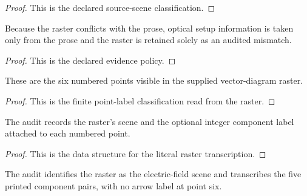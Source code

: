 \begin{proof}
  This is the declared source-scene classification.
\end{proof}
\begin{definition}
  \label{def:physics:phyx-mini-0478:phyxminiproblems-problemphyxmini0478-evidencepolicy}
  Because the raster conflicts with the prose, optical setup information is taken only from the prose and the raster is retained solely as an audited mismatch.
\end{definition}
\begin{proof}
  This is the declared evidence policy.
\end{proof}
\begin{definition}
  \label{def:physics:phyx-mini-0478:phyxminiproblems-problemphyxmini0478-rasterpoint}
  These are the six numbered points visible in the supplied vector-diagram raster.
\end{definition}
\begin{proof}
  This is the finite point-label classification read from the raster.
\end{proof}
\begin{definition}
  \label{def:physics:phyx-mini-0478:phyxminiproblems-problemphyxmini0478-suppliedrasteraudit}
  The audit records the raster's scene and the optional integer component label attached to each numbered point.
\end{definition}
\begin{proof}
  This is the data structure for the literal raster transcription.
\end{proof}
\begin{definition}
  \label{def:physics:phyx-mini-0478:phyxminiproblems-problemphyxmini0478-recordssuppliedrastermismatch}
  The audit identifies the raster as the electric-field scene and transcribes the five printed component pairs, with no arrow label at point six.
\end{definition}
